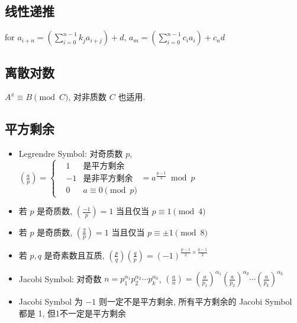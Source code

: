 \documentclass[landscape, twocolumn, 8pt, a4paper, twoside]{extarticle}
\begin{document}
\begin{spacing}{0.1}
\subsection{线性递推}
for $a_{i + n} = (\sum_{i = 0}^{n - 1} k_j a_{i + j}) + d$,
$a_m = (\sum_{i = 0}^{n - 1} c_i a_i) + c_n d$


%

\subsection{离散对数}
$A ^ x \equiv B \pmod{C}$, 对非质数 $C$ 也适用.


\subsection{平方剩余}
\begin{itemize}
\item Legrendre Symbol: 对奇质数 $p$, $(\frac{a}{p}) =
  \left\{
    \begin{aligned}
      &  1 & \textrm{是平方剩余} \\
      & -1 & \textrm{是非平方剩余} \\
      &  0 & \textrm{$a \equiv 0 \pmod{p}$}
    \end{aligned}
  \right.
  = a^{\frac{p - 1}{2}} \bmod{p} $
\item 若 $p$ 是奇质数, $(\frac{-1}{p}) = 1$ 当且仅当 $p \equiv 1 \pmod{4}$
\item 若 $p$ 是奇质数, $(\frac{ 2}{p}) = 1$ 当且仅当 $p \equiv \pm 1 \pmod{8}$
\item 若 $p, q$ 是奇素数且互质, $(\frac{p}{q})(\frac{q}{p}) = (-1)^{\frac{p - 1}{2} \times \frac{q - 1}{2}}$
\item Jacobi Symbol: 对奇数 $n = p_1^{\alpha_1} p_2^{\alpha_2} \cdots p_k ^ {\alpha_k} $, 
  $(\frac{a}{n}) = (\frac{a}{p_1})^{\alpha_1} (\frac{a}{p_2})^{\alpha_2} \cdots (\frac{a}{p_k})^{\alpha_k}$
\item Jacobi Symbol 为 $-1$ 则一定不是平方剩余, 所有平方剩余的 Jacobi Symbol 都是 1, 但1不一定是平方剩余
\end{itemize}


\end{spacing}
\end{document}
